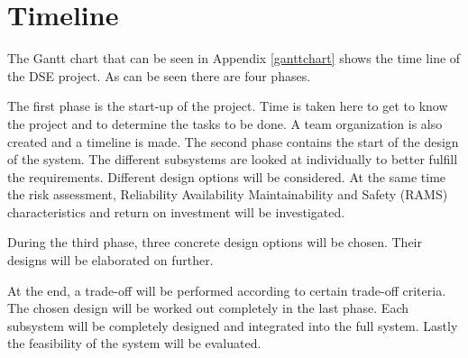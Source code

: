 \section{Timeline}
\label{dsePPTimeline}
The Gantt chart that can be seen in Appendix \ref{ganttchart}
shows the time line of the DSE project.
As can be seen there are four phases. 

The first phase is the start-up of the project. Time is taken here to get to know the project and to
determine the tasks to be done. A team organization is also created and a timeline is made.
The second phase contains the start of the design of the system. The different subsystems are looked 
at individually to better fulfill the requirements. Different design options will be considered.
At the same time the risk assessment, Reliability Availability Maintainability and Safety (RAMS) characteristics and return on investment will be investigated.

During the third phase, three concrete design options will be chosen. Their designs will be elaborated on further.

At the end, a trade-off will be performed according to certain trade-off criteria.
The chosen design will be worked out completely in the last phase. Each subsystem will be completely designed
and integrated into the full system. Lastly the feasibility of the system will be evaluated.